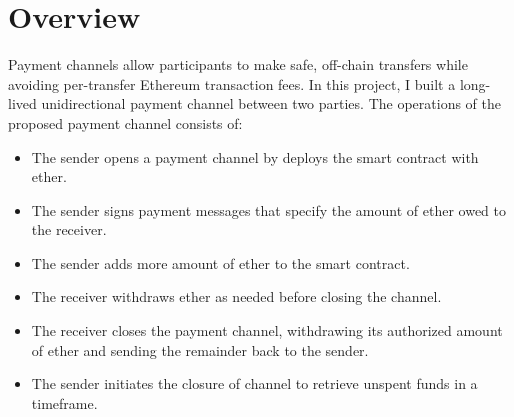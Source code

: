 \section{Overview}\label{sec:overview}
Payment channels allow participants to make safe, off-chain transfers while avoiding per-transfer Ethereum transaction
fees.
In this project, I built a long-lived unidirectional payment channel between two parties.
The operations of the proposed payment channel consists of:
\begin{itemize}
    \item The sender opens a payment channel by deploys the smart contract with ether.
    \item The sender signs payment messages that specify the amount of ether owed to the receiver.
    \item The sender adds more amount of ether to the smart contract.
    \item The receiver withdraws ether as needed before closing the channel.
    \item The receiver closes the payment channel, withdrawing its authorized amount of ether and sending the remainder
    back to the sender.
    \item The sender initiates the closure of channel to retrieve unspent funds in a timeframe.
\end{itemize}